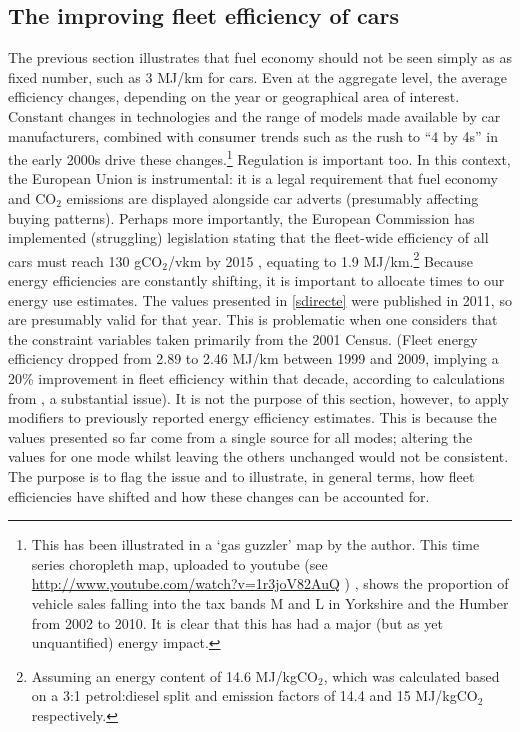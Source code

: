 \subsection{The improving fleet efficiency of cars}
The previous section illustrates that fuel economy should not be seen simply as as
fixed number, such as 3 MJ/km for cars. Even at the aggregate level, the
average efficiency changes, depending on the year or 
geographical area of interest. Constant changes in technologies and
the range of models made available by car manufacturers, combined
with consumer trends such as the rush to ``4 by 4s'' in the early 2000s
drive these changes.\footnote{This has
been illustrated in a `gas guzzler' map by the author.
This time series choropleth map, uploaded to youtube
(see \url{http://www.youtube.com/watch?v=1r3joV82AuQ} ) ,
shows the proportion of
vehicle sales falling into the tax bands M and L in Yorkshire and the
Humber from 2002 to 2010. It is clear that this has had a major
(but as yet unquantified) energy impact.
}
Regulation is important too. In this context,
the European Union is instrumental: it is a legal
requirement that fuel economy and CO$_2$ emissions
are displayed alongside car adverts (presumably affecting buying patterns).
Perhaps more importantly, the European Commission has implemented
(struggling) legislation stating that the fleet-wide efficiency of
all cars must reach 130 gCO$_2$/vkm by 2015 \citep{Fontaras2010}, equating to
1.9 MJ/km.\footnote{Assuming an energy content of 14.6 MJ/kgCO$_2$,
which was calculated based on a 3:1 petrol:diesel split and
emission factors of 14.4 and 15 MJ/kgCO$_2$ respectively.
}
Because energy efficiencies are constantly shifting, it is important
to allocate times to our energy use estimates. The values presented in
\cref{sdirecte} were published in 2011, so are presumably valid for that
year. This is problematic when one considers that the constraint variables
taken primarily from the 2001 Census.
(Fleet energy efficiency dropped from 2.89 to 2.46 MJ/km between 1999 and 2009,
implying a 20\% improvement in fleet efficiency within that decade,
according to calculations from \citet[table 2.8]{Decc2011t}, a substantial issue).
It is not the purpose of this section, however, to apply modifiers to previously reported
energy efficiency estimates. This is because the values presented so far
come from a single source for all modes; altering the values for
one mode whilst leaving the others unchanged would not be consistent.
The purpose is to flag the issue and to
illustrate, in general terms, how fleet efficiencies have shifted and
how these changes can be accounted for.

